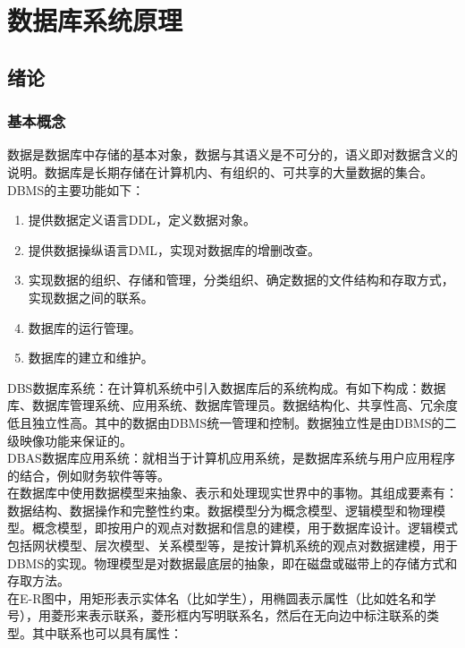 \documentclass[main.tex]{subfiles}
\begin{document}
\section{数据库系统原理}
\subsection{绪论}
\subsubsection{基本概念}
数据是数据库中存储的基本对象，数据与其语义是不可分的，语义即对数据含义的说明。数据库是长期存储在计算机内、有组织的、可共享的大量数据的集合。\\
DBMS的主要功能如下：\\
\begin{enumerate}
    \item 提供数据定义语言DDL，定义数据对象。
    \item 提供数据操纵语言DML，实现对数据库的增删改查。
    \item 实现数据的组织、存储和管理，分类组织、确定数据的文件结构和存取方式，实现数据之间的联系。
    \item 数据库的运行管理。
    \item 数据库的建立和维护。
\end{enumerate}
DBS数据库系统：在计算机系统中引入数据库后的系统构成。有如下构成：数据库、数据库管理系统、应用系统、数据库管理员。数据结构化、共享性高、冗余度低且独立性高。其中的数据由DBMS统一管理和控制。数据独立性是由DBMS的二级映像功能来保证的。\\
DBAS数据库应用系统：就相当于计算机应用系统，是数据库系统与用户应用程序的结合，例如财务软件等等。\\
在数据库中使用数据模型来抽象、表示和处理现实世界中的事物。其组成要素有：数据结构、数据操作和完整性约束。数据模型分为概念模型、逻辑模型和物理模型。概念模型，即按用户的观点对数据和信息的建模，用于数据库设计。逻辑模式包括网状模型、层次模型、关系模型等，是按计算机系统的观点对数据建模，用于DBMS的实现。物理模型是对数据最底层的抽象，即在磁盘或磁带上的存储方式和存取方法。\\
在E-R图中，用矩形表示实体名（比如学生），用椭圆表示属性（比如姓名和学号），用菱形来表示联系，菱形框内写明联系名，然后在无向边中标注联系的类型。其中联系也可以具有属性：
\end{document}
